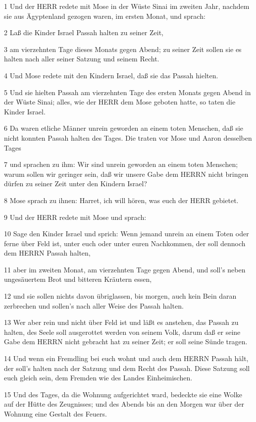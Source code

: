 \par 1 Und der HERR redete mit Mose in der Wüste Sinai im zweiten Jahr, nachdem sie aus Ägyptenland gezogen waren, im ersten Monat, und sprach:
\par 2 Laß die Kinder Israel Passah halten zu seiner Zeit,
\par 3 am vierzehnten Tage dieses Monats gegen Abend; zu seiner Zeit sollen sie es halten nach aller seiner Satzung und seinem Recht.
\par 4 Und Mose redete mit den Kindern Israel, daß sie das Passah hielten.
\par 5 Und sie hielten Passah am vierzehnten Tage des ersten Monats gegen Abend in der Wüste Sinai; alles, wie der HERR dem Mose geboten hatte, so taten die Kinder Israel.
\par 6 Da waren etliche Männer unrein geworden an einem toten Menschen, daß sie nicht konnten Passah halten des Tages. Die traten vor Mose und Aaron desselben Tages
\par 7 und sprachen zu ihm: Wir sind unrein geworden an einem toten Menschen; warum sollen wir geringer sein, daß wir unsere Gabe dem HERRN nicht bringen dürfen zu seiner Zeit unter den Kindern Israel?
\par 8 Mose sprach zu ihnen: Harret, ich will hören, was euch der HERR gebietet.
\par 9 Und der HERR redete mit Mose und sprach:
\par 10 Sage den Kinder Israel und sprich: Wenn jemand unrein an einem Toten oder ferne über Feld ist, unter euch oder unter euren Nachkommen, der soll dennoch dem HERRN Passah halten,
\par 11 aber im zweiten Monat, am vierzehnten Tage gegen Abend, und soll's neben ungesäuertem Brot und bitteren Kräutern essen,
\par 12 und sie sollen nichts davon übriglassen, bis morgen, auch kein Bein daran zerbrechen und sollen's nach aller Weise des Passah halten.
\par 13 Wer aber rein und nicht über Feld ist und läßt es anstehen, das Passah zu halten, des Seele soll ausgerottet werden von seinem Volk, darum daß er seine Gabe dem HERRN nicht gebracht hat zu seiner Zeit; er soll seine Sünde tragen.
\par 14 Und wenn ein Fremdling bei euch wohnt und auch dem HERRN Passah hält, der soll's halten nach der Satzung und dem Recht des Passah. Diese Satzung soll euch gleich sein, dem Fremden wie des Landes Einheimischen.
\par 15 Und des Tages, da die Wohnung aufgerichtet ward, bedeckte sie eine Wolke auf der Hütte des Zeugnisses; und des Abends bis an den Morgen war über der Wohnung eine Gestalt des Feuers.
